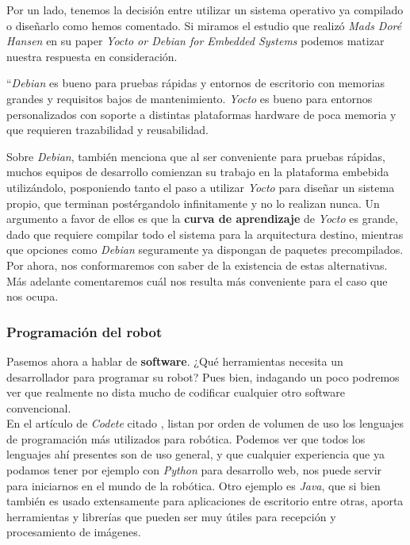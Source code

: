 Por un lado, tenemos la decisión entre utilizar un sistema operativo ya compilado o diseñarlo como hemos comentado. Si miramos el estudio que realizó \textit{Mads Doré Hansen} en su paper \textit{Yocto or Debian for Embedded Systems} \cite{yocto-or-debian} podemos matizar nuestra respuesta en consideración.

\begin{displayquote}
	``\textit{Debian} es bueno para pruebas rápidas y entornos de escritorio con memorias grandes y requisitos bajos de mantenimiento. \textit{Yocto} es bueno para entornos personalizados con soporte a distintas plataformas hardware de poca memoria y que requieren trazabilidad y reusabilidad.
\end{displayquote}

Sobre \textit{Debian}, también menciona que al ser conveniente para pruebas rápidas, muchos equipos de desarrollo comienzan su trabajo en la plataforma embebida utilizándolo, posponiendo tanto el paso a utilizar \textit{Yocto} para diseñar un sistema propio, que terminan postérgandolo infinitamente y no lo realizan nunca. Un argumento a favor de ellos es que la \textbf{curva de aprendizaje} de \textit{Yocto} es grande, dado que requiere compilar todo el sistema para la arquitectura destino, mientras que opciones como \textit{Debian} seguramente ya dispongan de paquetes precompilados.\\

Por ahora, nos conformaremos con saber de la existencia de estas alternativas. Más adelante comentaremos cuál nos resulta más conveniente para el caso que nos ocupa.\\


\subsubsection{Programación del robot}

Pasemos ahora a hablar de \textbf{software}. ¿Qué herramientas necesita un desarrollador para programar su robot? Pues bien, indagando un poco podremos ver que realmente no dista mucho de codificar cualquier otro software convencional.\\

En el artículo de \textit{Codete} citado \cite{codete}, listan por orden de volumen de uso los lenguajes de programación más utilizados para robótica. Podemos ver que todos los lenguajes ahí presentes son de uso general, y que cualquier experiencia que ya podamos tener por ejemplo con \textit{Python} para desarrollo web, nos puede servir para iniciarnos en el mundo de la robótica. Otro ejemplo es \textit{Java}, que si bien también es usado extensamente para aplicaciones de escritorio entre otras, aporta herramientas y librerías que pueden ser muy útiles para recepción y procesamiento de imágenes.\\

